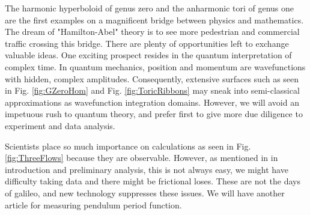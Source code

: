 \documentclass[nofootinbib,preprint]{revtex4-1}
\begin{document}
The harmonic hyperboloid of genus zero and the anharmonic tori of genus one are the first 
examples on a magnificent bridge between physics and mathematics. The dream of "Hamilton-Abel" 
theory is to see more pedestrian and commercial traffic crossing this bridge. There are plenty 
of opportunities left to exchange valuable ideas. One exciting prospect resides in the quantum
interpretation of complex time. In quantum mechanics, position and momentum are wavefunctions with 
hidden, complex amplitudes. Consequently, extensive surfaces such as seen in Fig. \ref{fig:GZeroHom} 
and Fig. \ref{fig:ToricRibbons} may sneak into semi-classical approximations as wavefunction 
integration domains. However, we will avoid an impetuous rush to quantum theory, and prefer first 
to give more due diligence to experiment and data analysis.

Scientists place so much importance on calculations as seen in Fig. \ref{fig:ThreeFlows} because 
they are observable. However, as mentioned in in introduction and preliminary analysis, this is 
not always easy, we might have difficulty taking data and there might be frictional loses. These 
are not the days of galileo, and new technology suppresses these issues. We will have another 
article for measuring pendulum period function.

 


\end{document}
